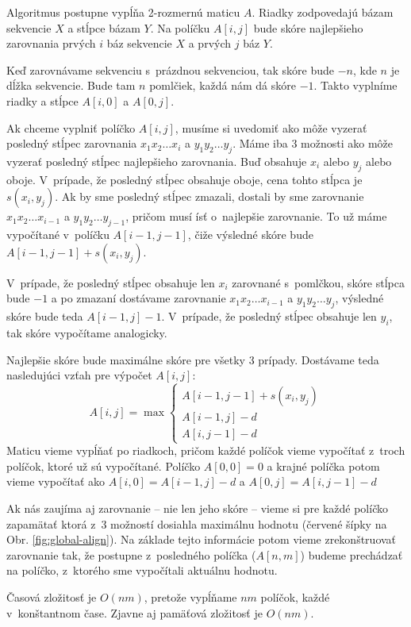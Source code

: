 Algoritmus postupne vypĺňa 2-rozmernú maticu $A$. Riadky zodpovedajú bázam sekvencie $X$ a stĺpce bázam $Y$. Na políčku $A[i,j]$ bude skóre najlepšieho zarovnania prvých $i$ báz sekvencie $X$ a prvých $j$ báz $Y$.

Keď zarovnávame sekvenciu s~prázdnou sekvenciou, tak skóre bude $-n$, kde $n$ je dĺžka sekvencie. Bude tam $n$ pomlčiek, každá nám dá skóre $-1$. Takto vyplníme riadky a stĺpce $A[i,0]$ a $A[0,j]$.

Ak chceme vyplniť políčko $A[i,j]$, musíme si uvedomiť ako môže vyzerať posledný stĺpec zarovnania $x_1x_2\dots x_i$ a $y_1y_2\dots y_j$. Máme iba 3 možnosti ako môže vyzerať posledný stĺpec najlepšieho zarovnania. Buď obsahuje $x_i$ alebo $y_j$ alebo oboje. V~prípade, že posledný stĺpec obsahuje oboje, cena tohto stĺpca je $s(x_i, y_j)$. Ak by sme posledný stĺpec zmazali, dostali by sme zarovnanie $x_1x_2\dots x_{i-1}$ a $y_1y_2\dots y_{j-1}$, pričom musí ísť o~najlepšie zarovnanie. To už máme vypočítané v~políčku $A[i-1, j-1]$, čiže výsledné skóre bude $A[i-1, j-1] + s(x_i,y_j)$.

V~prípade, že posledný stĺpec obsahuje len $x_i$ zarovnané s~pomlčkou, skóre stĺpca bude $-1$ a po zmazaní dostávame zarovnanie $x_1x_2\dots x_{i-1}$ a $y_1y_2\dots y_{j}$, výsledné skóre bude teda $A[i-1, j] -1$. V~prípade, že posledný stĺpec obsahuje len $y_i$, tak skóre vypočítame analogicky.

Najlepšie skóre bude maximálne skóre pre všetky 3 prípady.
Dostávame teda nasledujúci vzťah pre výpočet $A[i,j]$:
$$A[i,j] = \max \left\{
\begin{array}{l}
A[i-1,j-1]+s(x_i, y_j)\\
A[i-1,j]-d\\
A[i,j-1]-d
\end{array} \right.$$
Maticu vieme vypĺňať po riadkoch, pričom každé políčok vieme vypočítať z~troch políčok, ktoré už sú vypočítané. Políčko $A[0, 0] = 0$ a krajné políčka potom vieme vypočítať ako $A[i,0] = A[i-1,j]-d$ a $A[0, j] = A[i,j-1]-d$

Ak nás zaujíma aj zarovnanie -- nie len jeho skóre -- vieme si pre každé políčko zapamätať ktorá z~3 možností dosiahla maximálnu hodnotu
(červené šípky na Obr. \ref{fig:global-align}). Na základe tejto informácie potom vieme zrekonštruovať zarovnanie tak, že postupne z~posledného políčka ($A[n,m]$) budeme prechádzať na políčko, z~ktorého sme vypočítali aktuálnu hodnotu.

Časová zložitosť je $O(nm)$, pretože vypĺňame $nm$ políčok, každé v~konštantnom čase. Zjavne aj pamäťová zložitosť je $O(nm)$.

